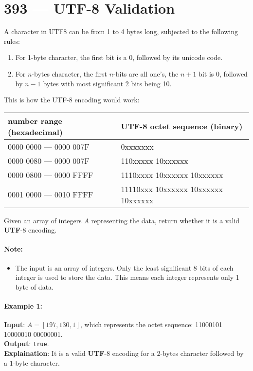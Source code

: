 \section{393 --- UTF-8 Validation}
A character in UTF8 can be from 1 to 4 bytes long, subjected to the following rules:
\begin{enumerate}
\item For 1-byte character, the first bit is a 0, followed by its unicode code.
\item For $ n $-bytes character, the first $ n $-bits are all one's, the $ n+1 $ bit is 0, followed by $ n-1 $ bytes with most significant 2 bits being 10.
\end{enumerate}
This is how the UTF-8 encoding would work:
\begin{table}[H]
\begin{tabular}{ll}
number range (hexadecimal) &  UTF-8 octet sequence (binary) \\
\hline
0000 0000 --- 0000 007F & 0xxxxxxx \\
0000 0080 --- 0000 007F & 110xxxxx 10xxxxxx \\
0000 0800 --- 0000 FFFF & 1110xxxx 10xxxxxx 10xxxxxx \\
0001 0000 --- 0010 FFFF & 11110xxx 10xxxxxx 10xxxxxx 10xxxxxx
\end{tabular}
\end{table}
Given an array of integers $A$ representing the data, return whether it is a valid \textbf{UTF}-8 encoding.

\paragraph{Note:}
\begin{itemize}
\item The input is an array of integers. Only the least significant 8 bits of each integer is used to store the data. This means each integer represents only 1 byte of data.
\end{itemize}

\paragraph{Example 1:}

\begin{flushleft}
\textbf{Input}: $A = [197, 130, 1]$, which represents the octet sequence: 11000101 10000010 00000001.
\\
\textbf{Output}: \texttt{true}.
\\
\textbf{Explaination}: It is a valid \textbf{UTF}-8 encoding for a 2-bytes character followed by a 1-byte character.
\end{flushleft}

